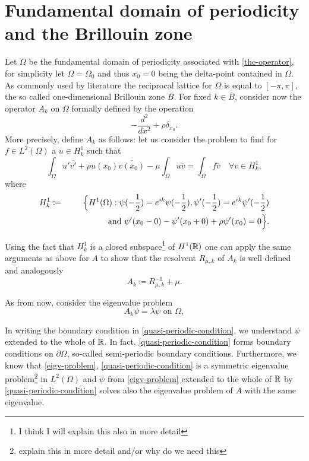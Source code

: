 \chapter{Fundamental domain of periodicity and the Brillouin zone}

Let $\Omega$ be the fundamental domain of periodicity associated with \eqref{the-operator}, for simplicity let $\Omega = \Omega_{0}$ and thus $x_{0} = 0$ being the delta-point contained in $\Omega$. As commonly used by literature the reciprocal lattice for $\Omega$ is equal to $[-\pi, \pi]$, the so called one-dimensional Brillouin zone $B$. For fixed $k \in \overline{B}$, consider now the operator $A_{k}$ on $\Omega$ formally defined by the operation
		\[ -\frac{d^{2}}{dx^{2}} + \rho \delta_{x_{0}}. \]
	More precisely, define $A_{k}$ as follows: let us consider the problem to find for $f \in L^{2}(\Omega)$ a $u \in H^{1}_{k}$ such that
	\[ \int_{\Omega} u' \overline{v'} + \rho u(x_{0}) \overline{v(x_{0})} - \mu \int_{\Omega} u \overline{v} = \int_{\Omega} f \overline{v} \quad \forall v \in H^{1}_{k}, \]
	where 
	\begin{eqnarray}
		H^{1}_{k} & \coloneqq & \Big\{ H^{1}(\Omega): \psi(-\frac{1}{2}) = e^{ik} \psi(-\frac{1}{2}), \psi'(-\frac{1}{2}) = e^{ik} \psi'(-\frac{1}{2}) \notag \\ & ~ &\qquad~\qquad  \text{ and } \psi'(x_{0} - 0) - \psi'(x_{0} + 0) + \rho \psi'(x_{0}) = 0 \Big\}. \label{quasi-periodic-condition}	
	\end{eqnarray}

 	Using the fact that $H^{1}_{k}$ is a closed subspace\footnote{I think I will explain this also in more detail} of $H^{1}(\mathbb{R})$ one can apply the same arguments as above for $A$ to show that the resolvent $R_{\mu, k}$ of $A_{k}$ is well defined and analogously
		\[ A_{k} \coloneqq R_{\mu, k}^{-1} + \mu. \] 
		
	As from now, consider the eigenvalue problem
	\begin{equation}
		A_{k} \psi = \lambda \psi \text{ on } \Omega, \label{eigv-problem}
	\end{equation}

	In writing the boundary condition in \eqref{quasi-periodic-condition}, we understand $\psi$ extended to the whole of $\mathbb{R}$. In fact, \eqref{quasi-periodic-condition} forms boundary conditions on $\partial \Omega$, so-called semi-periodic boundary conditions. Furthermore, we know that \eqref{eigv-problem}, \eqref{quasi-periodic-condition} is a symmetric eigenvalue problem\footnote{explain this in more detail and/or why do we need this} in $L^{2}(\Omega)$ and $\psi$ from \eqref{eigv-problem} extended to the whole of $\mathbb{R}$ by \eqref{quasi-periodic-condition} solves also the eigenvalue problem of $A$ with the same eigenvalue. \\
	
